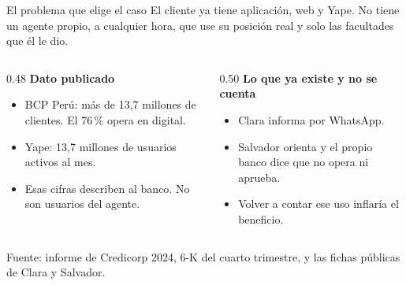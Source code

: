 \documentclass[aspectratio=169,11pt]{beamer}
\begin{document}
\begin{frame}{El problema que elige el caso}
\vspace{0.1cm}
El cliente ya tiene aplicación, web y Yape. No tiene un agente propio, a cualquier hora, que use su posición real y solo las facultades que él le dio.

\vspace{0.35em}
\begin{columns}[T]
\begin{column}{0.48\textwidth}
{\color{bcp}\bfseries Dato publicado}
\begin{itemize}
\setlength{\itemsep}{0.16em}
  \item BCP Perú: más de 13{,}7 millones de clientes. El 76\,\% opera en digital.
  \item Yape: 13{,}7 millones de usuarios activos al mes.
  \item Esas cifras describen al banco. No son usuarios del agente.
\end{itemize}
\end{column}
\begin{column}{0.50\textwidth}
{\color{cobre}\bfseries Lo que ya existe y no se cuenta}
\begin{itemize}
\setlength{\itemsep}{0.16em}
  \item Clara informa por WhatsApp.
  \item Salvador orienta y el propio banco dice que no opera ni aprueba.
  \item Volver a contar ese uso inflaría el beneficio.
\end{itemize}
\end{column}
\end{columns}
\vspace{0.35cm}
{\small\color{muted} Fuente: informe de Credicorp 2024, 6-K del cuarto trimestre, y las fichas públicas de Clara y Salvador.}
\end{frame}
\end{document}
